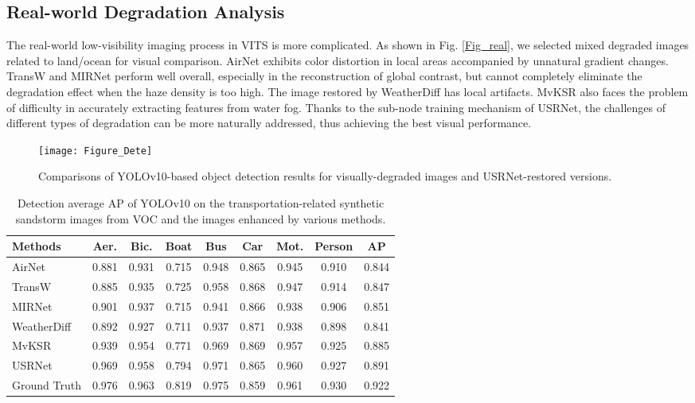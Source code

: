 \documentclass[final,12pt]{elsarticle}
\begin{document}
\subsection{Real-world Degradation Analysis}
    The real-world low-visibility imaging process in VITS is more complicated. As shown in Fig. \ref{Fig_real}, we selected mixed degraded images related to land/ocean for visual comparison. AirNet exhibits color distortion in local areas accompanied by unnatural gradient changes. TransW and MIRNet perform well overall, especially in the reconstruction of global contrast, but cannot completely eliminate the degradation effect when the haze density is too high. The image restored by WeatherDiff has local artifacts. MvKSR also faces the problem of difficulty in accurately extracting features from water fog. Thanks to the sub-node training mechanism of USRNet, the challenges of different types of degradation can be more naturally addressed, thus achieving the best visual performance.
%
    \begin{figure*}[t]
        \centering
        \setlength{\abovecaptionskip}{0.cm}
        \texttt{[image: Figure\_Dete]}
        \caption{Comparisons of YOLOv10-based object detection results for visually-degraded images and USRNet-restored versions.}
        \label{Figure_Dete}
    \end{figure*}
    \setlength{\tabcolsep}{2.00pt}
    \begin{table}[t]
        \centering
        \scriptsize
        \caption{Detection average AP of YOLOv10 on the transportation-related synthetic sandstorm images from VOC and the images enhanced by various methods.}
       \begin{tabular}{l|cccccccc}
        \hline
        Methods                       & Aer.        & Bic.          & Boat             & Bus              & Car              & Mot.        & Person                       & AP              \\ \hline \hline
        AirNet \citep{li2022all}                         & 0.881 & 0.931 & 0.715 & 0.948 & 0.865 & 0.945 & 0.910 & 0.844  \\ 
        TransW \citep{valanarasu2022transweather}                         & 0.885 & 0.935 & 0.725 & 0.958 & 0.868 & 0.947 & 0.914 & 0.847 \\ 
        MIRNet \citep{zamir2022learning}                         & 0.901 & 0.937 & 0.715 & 0.941 & 0.866 & 0.938 & 0.906 & 0.851 \\ 
        WeatherDiff \citep{ozdenizci2023restoring}                         & 0.892 & 0.927 & 0.711 & 0.937 & 0.871 & 0.938 & 0.898 & 0.841  \\ 
        MvKSR \citep{xu2024mvksr}                         & 0.939 & 0.954 & 0.771 & 0.969 & 0.869 & 0.957 & 0.925 & 0.885 \\ 
        USRNet                         & 0.969 & 0.958 & 0.794 & 0.971 & 0.865 & 0.960 & 0.927 & 0.891 \\ \hline
        Ground Truth                   & 0.976 & 0.963     & 0.819     & 0.975 & 0.859 & 0.961  & 0.930 & 0.922  \\ \hline
        \end{tabular}
        \label{Table_detection}
    \end{table}
%
\end{document}
